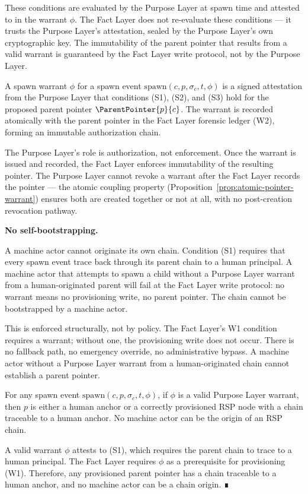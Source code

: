 These conditions are evaluated by the Purpose Layer at spawn time and attested to in the warrant $\phi$. The Fact Layer does not re-evaluate these conditions --- it trusts the Purpose Layer's attestation, sealed by the Purpose Layer's own cryptographic key. The immutability of the parent pointer that results from a valid warrant is guaranteed by the Fact Layer write protocol, not by the Purpose Layer.

\begin{dfn}
\label{def:spawn-warrant}
A spawn warrant $\phi$ for a spawn event $\mathrm{spawn}(c, p, \sigma_c, t, \phi)$ is a signed attestation from the Purpose Layer that conditions (S1), (S2), and (S3) hold for the proposed parent pointer $\ParentPointer{p}{c}$. The warrant is recorded atomically with the parent pointer in the Fact Layer forensic ledger (W2), forming an immutable authorization chain.
\end{dfn}

The Purpose Layer's role is authorization, not enforcement. Once the warrant is issued and recorded, the Fact Layer enforces immutability of the resulting pointer. The Purpose Layer cannot revoke a warrant after the Fact Layer records the pointer --- the atomic coupling property (Proposition~\ref{prop:atomic-pointer-warrant}) ensures both are created together or not at all, with no post-creation revocation pathway.

\medskip
\noindent\textbf{No self-bootstrapping.}

A machine actor cannot originate its own chain. Condition (S1) requires that every spawn event trace back through its parent chain to a human principal. A machine actor that attempts to spawn a child without a Purpose Layer warrant from a human-originated parent will fail at the Fact Layer write protocol: no warrant means no provisioning write, no parent pointer. The chain cannot be bootstrapped by a machine actor.

This is enforced structurally, not by policy. The Fact Layer's W1 condition requires a warrant; without one, the provisioning write does not occur. There is no fallback path, no emergency override, no administrative bypass. A machine actor without a Purpose Layer warrant from a human-originated chain cannot establish a parent pointer.

\begin{prop}
\label{prop:no-self-origination}
For any spawn event $\mathrm{spawn}(c, p, \sigma_c, t, \phi)$, if $\phi$ is a valid Purpose Layer warrant, then $p$ is either a human anchor or a correctly provisioned RSP node with a chain traceable to a human anchor. No machine actor can be the origin of an RSP chain.
\end{prop}
\begin{pf}
A valid warrant $\phi$ attests to (S1), which requires the parent chain to trace to a human principal. The Fact Layer requires $\phi$ as a prerequisite for provisioning (W1). Therefore, any provisioned parent pointer has a chain traceable to a human anchor, and no machine actor can be a chain origin. ∎
\end{pf}

